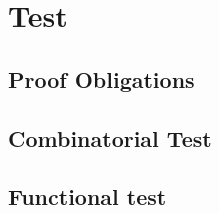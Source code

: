 \chapter{Test}\label{chp:Test}

\section{Proof Obligations}


\section{Combinatorial Test}


\section{Functional test}